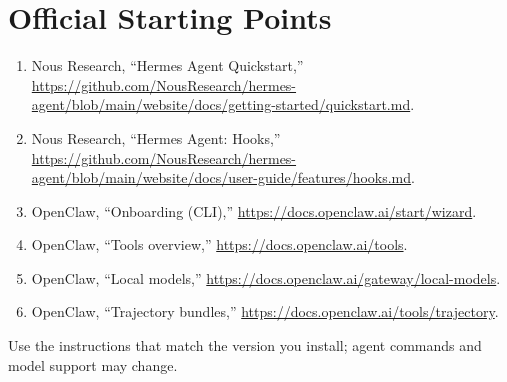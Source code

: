 \documentclass[11pt]{article}
\begin{document}
\section{Official Starting Points}
\begin{enumerate}
  \item Nous Research, ``Hermes Agent Quickstart,'' \url{https://github.com/NousResearch/hermes-agent/blob/main/website/docs/getting-started/quickstart.md}.
  \item Nous Research, ``Hermes Agent: Hooks,'' \url{https://github.com/NousResearch/hermes-agent/blob/main/website/docs/user-guide/features/hooks.md}.
  \item OpenClaw, ``Onboarding (CLI),'' \url{https://docs.openclaw.ai/start/wizard}.
  \item OpenClaw, ``Tools overview,'' \url{https://docs.openclaw.ai/tools}.
  \item OpenClaw, ``Local models,'' \url{https://docs.openclaw.ai/gateway/local-models}.
  \item OpenClaw, ``Trajectory bundles,'' \url{https://docs.openclaw.ai/tools/trajectory}.
\end{enumerate}
Use the instructions that match the version you install; agent commands and model support may change.
\end{document}

